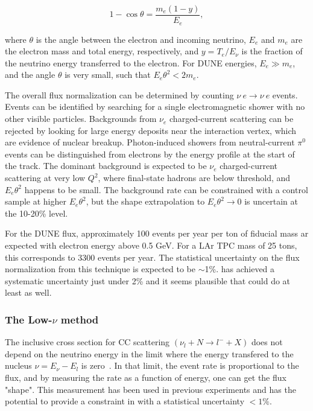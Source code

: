\begin{equation}
1 - \cos \theta = \frac{m_{e}(1-y)}{E_{e}},
\end{equation}

where $\theta$ is the angle between the electron and incoming neutrino, $E_{e}$ and $m_{e}$ are the electron mass and total energy, respectively, and $y = T_{e}/E_{\nu}$ is the fraction of the neutrino energy transferred to the electron. For DUNE energies, $E_{e} \gg m_{e}$, and the angle $\theta$ is very small, such that $E_{e}\theta^{2} < 2m_{e}$. 

The overall flux normalization can be determined by counting $\nu \ e \rightarrow \nu \ e$ events. Events can be identified by searching for a single electromagnetic shower with no other visible particles. Backgrounds from $\nu_{e}$ charged-current scattering can be rejected by looking for large energy deposits near the interaction vertex, which are evidence of nuclear breakup. Photon-induced showers from neutral-current $\pi^{0}$ events can be distinguished from electrons by the energy profile at the start of the track. The dominant background is expected to be $\nu_{e}$ charged-current scattering at very low $Q^{2}$, where final-state hadrons are below threshold, and $E_{e}\theta^{2}$ happens to be small. The background rate can be constrained with a control sample at higher $E_{e}\theta^{2}$, but the shape extrapolation to $E_{e}\theta^{2} \rightarrow 0$ is uncertain at the 10-20\% level.

For the DUNE flux, approximately 100 events per year per ton of fiducial mass ar expected with electron energy above 0.5 GeV. For a LAr TPC mass of 25 tons, this corresponds to 3300 events per year. The statistical uncertainty on the flux normalization from this technique is expected to be $\sim$1\%. \minerva has achieved a systematic uncertainty just under 2\% and it seems plausible that \dune could do at least as well\cite{bib:minervanue}. 


\subsubsection{The Low-$\nu$ method}
The inclusive cross section for CC scattering $(\nu_l+N\rightarrow l^-+X)$ does not depend on the neutrino energy in the limit where the energy transfered to the nucleus $\nu = E_\nu-E_{l} $ is zero~\cite{bib:original_lownu}.  In that limit, the event rate is proportional to the flux, and by measuring the rate as a function of energy, one can get the flux "shape". This measurement has been used in previous experiments and has the potential to provide a constraint in \dune with a statistical uncertainty $<1\%$.

